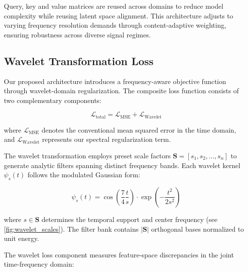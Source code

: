 \documentclass[10pt,twocolumn]{article}
\begin{document}


Query, key and value matrices are reused across domains to reduce model complexity while reusing latent space alignment. This architecture adjusts to varying frequency resolution demands through content-adaptive weighting, ensuring robustness across diverse signal regimes.


\subsection{Wavelet Transformation Loss}

Our proposed architecture introduces a frequency-aware objective function through wavelet-domain regularization. The composite loss function consists of two complementary components:

\begin{equation}
    \mathcal{L}_{\text{total}} = \mathcal{L}_{\text{MSE}} + \mathcal{L}_{\text{Wavelet}}
    \label{eq:combined_loss}
\end{equation}

where $\mathcal{L}_{\text{MSE}}$ denotes the conventional mean squared error in the time domain, and $\mathcal{L}_{\text{Wavelet}}$ represents our spectral regularization term.


The wavelet transformation employs preset scale factors $\mathbf{S} = [s_1, s_2, ..., s_n]$ to generate analytic filters spanning distinct frequency bands. Each wavelet kernel $\psi_s(t)$ follows the modulated Gaussian form:

\begin{equation}
    \psi_s(t) = \cos\left(\frac{7}{4}\frac{t}{s}\right) \cdot \exp\left(-\frac{t^2}{2s^2}\right)
    \label{eq:wavelet_def}
\end{equation}

where $s \in \mathbf{S}$ determines the temporal support and center frequency (see \autoref{fig:wavelet_scales}). The filter bank contains $|\mathbf{S}|$ orthogonal bases normalized to unit energy.


The wavelet loss component measures feature-space discrepancies in the joint time-frequency domain:
\end{document}
